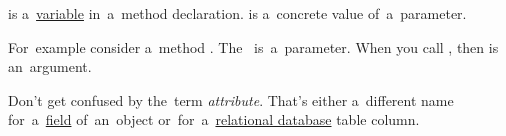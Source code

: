 \begin{itemize}
     is a~\hyperref[variablefieldproperty]{variable} in~a~method declaration.
     is a~concrete value of~a~parameter.
\end{itemize}
For~example consider a~method .
The~ is~a~parameter.
When you call , then  is an~argument.

\warning Don't get confused by the~term \textit{attribute}.
That's either a~different name for~a~\hyperref[variablefieldproperty]{field} of~an~object or~for~a~\hyperref[relationaldatabase]{relational database} table column.
